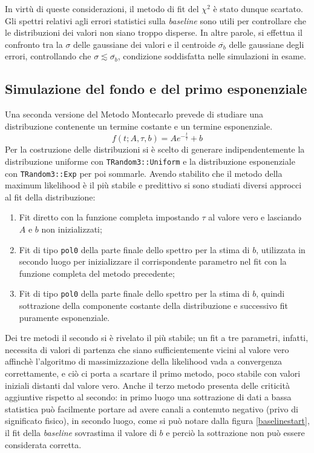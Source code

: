 \documentclass[10pt, oneside, a4paper]{article}   	%
\begin{document}
In virtù di queste considerazioni, il metodo di fit del $\chi^2$ è stato dunque scartato. 
Gli spettri relativi agli errori statistici sulla \textit{baseline} sono utili per controllare che le distribuzioni dei valori non siano troppo disperse. In altre parole, si effettua il confronto tra la $\sigma$ delle gaussiane dei valori e il centroide $\overline{\sigma_{b}}$ delle gaussiane degli errori, controllando che $\sigma\lesssim \overline{\sigma_{b}}$, condizione soddisfatta nelle simulazioni in esame.
%
\subsection{Simulazione del fondo e del primo esponenziale}
Una seconda versione del Metodo Montecarlo prevede di studiare una distribuzione contenente un termine costante e un termine esponenziale. 
\begin{equation}
 f(t;A,\tau,b)=Ae^{-\frac{t}{\tau}}+b
 \label{eq::exp_plus_base}
\end{equation}
Per la costruzione delle distribuzioni si è scelto di generare indipendentemente la distribuzione uniforme con \lstinline{TRandom3::Uniform} e la distribuzione esponenziale con \lstinline{TRandom3::Exp} per poi sommarle. Avendo stabilito che il metodo della maximum likelihood è il più stabile e predittivo si sono studiati diversi approcci al fit della distribuzione:
\begin{enumerate}
  \item Fit diretto con la funzione completa impostando $\tau$ al valore vero e lasciando $A$ e $b$ non inizializzati;
  \item Fit di tipo \lstinline{pol0} della parte finale dello spettro per la stima di $b$, utilizzata in secondo luogo per inizializzare il corrispondente parametro nel fit con la funzione completa del metodo precedente;
  \item Fit di tipo \lstinline{pol0} della parte finale dello spettro per la stima di $b$, quindi sottrazione della componente costante della distribuzione e successivo fit puramente esponenziale.
\end{enumerate}
Dei tre metodi il secondo si è rivelato il più stabile; un fit a tre parametri, infatti, necessita di valori di partenza che siano sufficientemente vicini al valore vero affinchè l'algoritmo di massimizzazione della likelihood vada a convergenza correttamente, e ciò ci porta a scartare il primo metodo, poco stabile con valori iniziali distanti dal valore vero. Anche il terzo metodo presenta delle criticità aggiuntive rispetto al secondo: in primo luogo una sottrazione di dati a bassa statistica può facilmente portare ad avere canali a contenuto negativo (privo di significato fisico), in secondo luogo, come si può notare dalla figura \ref{baselinestart}, il fit della \textit{baseline} sovrastima il valore di $b$ e perciò la sottrazione non può essere considerata corretta.
\end{document}
